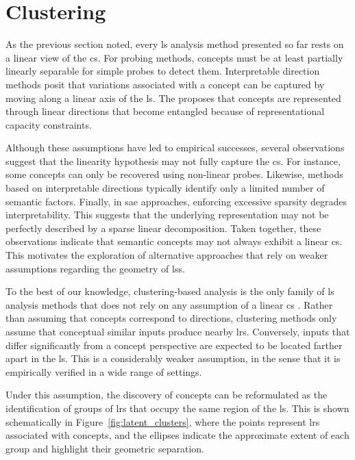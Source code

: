 \section{Clustering}
\label{sec:latent_space_analysis_clustering}

As the previous section noted, every \gls{ls} analysis method presented so far rests on a linear view of the \gls{cs}.
For probing methods, concepts must be at least partially linearly separable for simple probes to detect them.
Interpretable direction methods posit that variations associated with a concept can be captured by moving along a linear axis of the \gls{ls}.
The \SuperpositionHypothesisName proposes that concepts are represented through linear directions that become entangled because of representational capacity constraints.

Although these assumptions have led to empirical successes, several observations suggest that the linearity hypothesis may not fully capture the \gls{cs}.
For instance, some concepts can only be recovered using non-linear probes.
Likewise, methods based on interpretable directions typically identify only a limited number of semantic factors.
Finally, in \gls{sae} approaches, enforcing excessive sparsity degrades interpretability.
This suggests that the underlying representation may not be perfectly described by a sparse linear decomposition.
Taken together, these observations indicate that semantic concepts may not always exhibit a linear \gls{cs}.
This motivates the exploration of alternative approaches that rely on weaker assumptions regarding the geometry of \glspl{ls}.

To the best of our knowledge, clustering-based analysis is the only family of \gls{ls} analysis methods that does not rely on any assumption of a linear \gls{cs} \parencite{ren_deep_2022, wei_overview_2024}.
Rather than assuming that concepts correspond to directions, clustering methods only assume that conceptual similar inputs produce nearby \glspl{lr}.
Conversely, inputs that differ significantly from a concept perspective are expected to be located farther apart in the \gls{ls}.
This is a considerably weaker assumption, in the sense that it is empirically verified in a wide range of settings.

Under this assumption, the discovery of concepts can be reformulated as the identification of groups of \glspl{lr} that occupy the same region of the \gls{ls}.
This is shown schematically in Figure~\ref{fig:latent_clusters}, where the points represent \glspl{lr} associated with concepts, and the ellipses indicate the approximate extent of each group and highlight their geometric separation.

